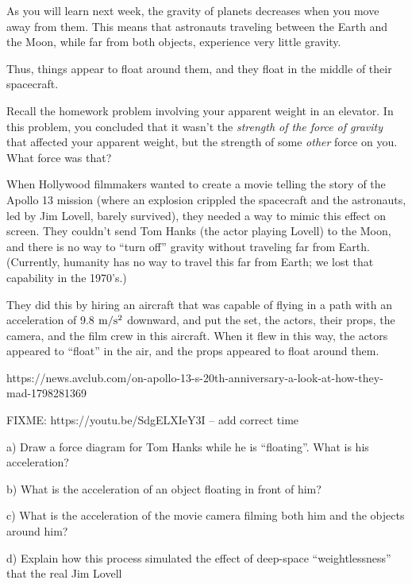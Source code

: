 \documentclass[12pt]{article}
\begin{document}
\Large
\centerline{}
\normalsize
\centerline{}

As you will learn next week, the gravity of planets decreases when you move away from them. This means that astronauts traveling between the Earth and the Moon, while far from both objects, experience very little gravity.

Thus, things appear to float around them, and they float in the middle of their spacecraft.

Recall the homework problem involving your apparent weight in an elevator. In this problem, you concluded that it wasn't the {\it strength of the force of gravity} that affected your apparent weight, but the strength of some {\it other} force on you. What force was that?



When Hollywood filmmakers wanted to create a movie telling the story of the Apollo 13 mission (where an explosion crippled the spacecraft and the astronauts, led by Jim Lovell, barely survived), they needed a way to mimic this effect on screen. They couldn't send Tom Hanks (the actor playing Lovell) to the Moon, and there is no way to ``turn off'' gravity without traveling far from Earth. (Currently, humanity has no way to travel this far from Earth; we lost that capability in the 1970's.)

They did this by hiring an aircraft that was capable of flying in a path with an acceleration of 9.8 $\rm m/\rm s^2$ downward, and put the set, the actors, their props, the camera, and the film  crew in this aircraft. When it flew in this way, the actors appeared to ``float'' in the air, and the props appeared to float around them.

https://news.avclub.com/on-apollo-13-s-20th-anniversary-a-look-at-how-they-mad-1798281369

FIXME: https://youtu.be/SdgELXIeY3I -- add correct time


a) Draw a force diagram for Tom Hanks  while he is ``floating''. What is his acceleration?

b) What is the acceleration of an object floating in front of him?

c) What is the acceleration of the movie camera filming both him and the objects around him?

d) Explain how this process simulated the effect of deep-space ``weightlessness'' that the real Jim Lovell 
\end{document}

